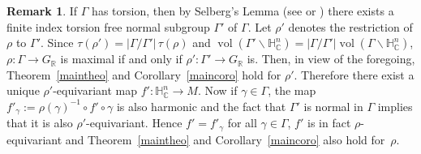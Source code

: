 \documentclass[JEP,XML,SOM,Unicode,NoFloatCountersInSection]{cedram}
\newcommand{\citestar}[3]{\cite[#3]{#1}}
\theoremstyle{plain}
\theoremstyle{definition}
\newtheorem{rema}[theo]{Remark}
\DeclareMathOperator{\vol}{vol}
\newcommand{\bR}{\mathbb{R}}
\newcommand{\HC}{{\mathbb{H}^n_\mathbb{C}}}
\begin{document}
\begin{rema}\label{rema:torsion}
If $\Gamma$ has torsion, then by
Selberg's Lemma (see \citestar{ratcliffe}*{p.\,327} or \cite{selberg}) there exists a finite index
torsion free normal subgroup $\Gamma'$ of $\Gamma$. Let $\rho'$ denotes the
restriction of $\rho$ to $\Gamma'$. Since $\tau(\rho') = |\Gamma/\Gamma'|\, \tau(\rho)$ and
$\vol(\Gamma'\backslash\HC)=|\Gamma/\Gamma'|\vol(\Gamma\backslash\HC)$, $\rho:\Gamma\to G_\bR$ is
maximal if and only if $\rho':\Gamma'\to G_\bR$ is. Then, in view of the foregoing,
Theorem~\ref{maintheo} and Corollary~\ref{maincoro} hold for $\rho'$. Therefore there exist a unique
$\rho'$-equivariant map $f':\HC\to M$. Now if $\gamma\in\Gamma$, the map $f'_\gamma:=\rho(\gamma)^{-1}\circ f'\circ\gamma$ is
also harmonic and the fact that $\Gamma'$ is normal in $\Gamma$ implies that it is also
$\rho'$-equivariant.
Hence $f'=f'_\gamma$ for all $\gamma\in\Gamma$, \ie $f'$ is in fact
$\rho$-equivariant and Theorem~\ref{maintheo} and Corollary~\ref{maincoro} also hold for~$\rho$.
\end{rema}
\egroup

\backmatter


\end{document}
